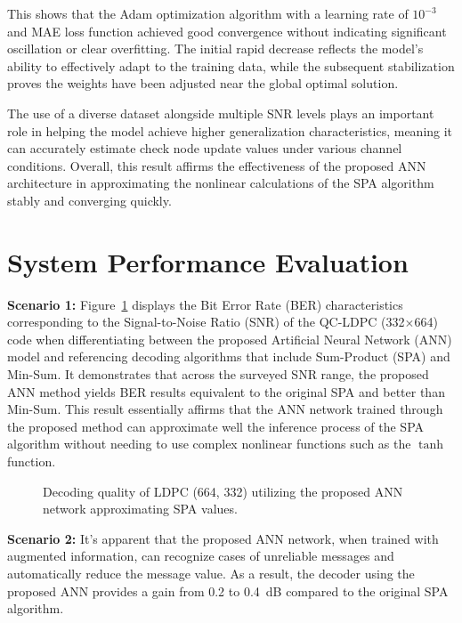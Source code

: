 \documentclass[a4paper,14pt]{extreport}
\begin{document}
This shows that the Adam optimization algorithm with a learning rate of $10^{-3}$ and MAE loss function achieved good convergence without indicating significant oscillation or clear overfitting. The initial rapid decrease reflects the model's ability to effectively adapt to the training data, while the subsequent stabilization proves the weights have been adjusted near the global optimal solution.

The use of a diverse dataset alongside multiple SNR levels plays an important role in helping the model achieve higher generalization characteristics, meaning it can accurately estimate check node update values under various channel conditions. Overall, this result affirms the effectiveness of the proposed ANN architecture in approximating the nonlinear calculations of the SPA algorithm stably and converging quickly.

\section{System Performance Evaluation}

\textbf{Scenario 1:} Figure~\ref{fig:ber_scenario1} displays the Bit Error Rate (BER) characteristics corresponding to the Signal-to-Noise Ratio (SNR) of the QC-LDPC (332$\times$664) code when differentiating between the proposed Artificial Neural Network (ANN) model and referencing decoding algorithms that include Sum-Product (SPA) and Min-Sum. It demonstrates that across the surveyed SNR range, the proposed ANN method yields BER results equivalent to the original SPA and better than Min-Sum. This result essentially affirms that the ANN network trained through the proposed method can approximate well the inference process of the SPA algorithm without needing to use complex nonlinear functions such as the $\tanh$ function.

\begin{figure}[H]
    \centering
    \caption{Decoding quality of LDPC (664, 332) utilizing the proposed ANN network approximating SPA values.}
    \label{fig:ber_scenario1}
\end{figure}

\textbf{Scenario 2:} It's apparent that the proposed ANN network, when trained with augmented information, can recognize cases of unreliable messages and automatically reduce the message value. As a result, the decoder using the proposed ANN provides a gain from 0.2 to 0.4~dB compared to the original SPA algorithm.
\end{document}
